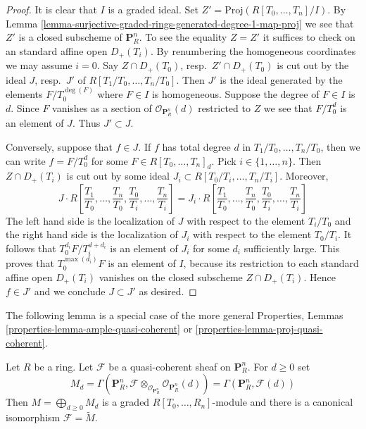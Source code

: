 \begin{proof}
It is clear that $I$ is a graded ideal.
Set $Z' = \text{Proj}(R[T_0, \ldots, T_n]/I)$.
By Lemma \ref{lemma-surjective-graded-rings-generated-degree-1-map-proj}
we see that $Z'$ is a closed subscheme of $\mathbf{P}^n_R$.
To see the equality $Z = Z'$
it suffices to check on an standard affine open
$D_{+}(T_i)$. By renumbering the homogeneous coordinates we
may assume $i = 0$. Say $Z \cap D_{+}(T_0)$, resp.\ $Z' \cap D_{+}(T_0)$
is cut out by the ideal $J$, resp.\ $J'$ of $R[T_1/T_0, \ldots, T_n/T_0]$.
Then $J'$ is the ideal generated by the elements $F/T_0^{\deg(F)}$ where
$F \in I$ is homogeneous.
Suppose the degree of $F \in I$ is $d$. Since $F$ vanishes as a section
of $\mathcal{O}_{\mathbf{P}^n_R}(d)$ restricted to $Z$ we see that
$F/T_0^d$ is an element of $J$. Thus $J' \subset J$.

\medskip\noindent
Conversely, suppose that $f \in J$. If $f$ has total degree
$d$ in $T_1/T_0, \ldots, T_n/T_0$, then we can write
$f = F/T_0^d$ for some $F \in R[T_0, \ldots, T_n]_d$.
Pick $i \in \{1, \ldots, n\}$. Then $Z \cap D_{+}(T_i)$ is
cut out by some ideal $J_i \subset R[T_0/T_i, \ldots, T_n/T_i]$.
Moreover,
$$
J \cdot
R\left[
\frac{T_1}{T_0}, \ldots, \frac{T_n}{T_0},
\frac{T_0}{T_i}, \ldots, \frac{T_n}{T_i}
\right]
=
J_i \cdot
R\left[
\frac{T_1}{T_0}, \ldots, \frac{T_n}{T_0},
\frac{T_0}{T_i}, \ldots, \frac{T_n}{T_i}
\right]
$$
The left hand side is the localization of $J$ with respect to the
element $T_i/T_0$ and the right hand side is the localization of $J_i$
with respect to the element $T_0/T_i$. It follows that
$T_0^{d_i}F/T_i^{d + d_i}$ is an element of $J_i$ for some $d_i$
sufficiently large. This proves that $T_0^{\max(d_i)}F$ is an
element of $I$, because its restriction to each standard affine
open $D_{+}(T_i)$ vanishes on the closed subscheme
$Z \cap D_{+}(T_i)$. Hence $f \in J'$ and we conclude $J \subset J'$
as desired.
\end{proof}

\noindent
The following lemma is a special case of the more general
Properties, Lemmas \ref{properties-lemma-ample-quasi-coherent} or
\ref{properties-lemma-proj-quasi-coherent}.

\begin{lemma}
\label{lemma-quasi-coherent-projective-space}
Let $R$ be a ring.
Let $\mathcal{F}$ be a quasi-coherent sheaf on $\mathbf{P}^n_R$.
For $d \geq 0$ set
$$
M_d
=
\Gamma(\mathbf{P}^n_R,
\mathcal{F} \otimes_{\mathcal{O}_{\mathbf{P}^n_R}}
\mathcal{O}_{\mathbf{P}^n_R}(d))
=
\Gamma(\mathbf{P}^n_R, \mathcal{F}(d))
$$
Then $M = \bigoplus_{d \geq 0} M_d$ is a graded $R[T_0, \ldots, R_n]$-module
and there is a canonical isomorphism $\mathcal{F} = \widetilde{M}$.
\end{lemma}

